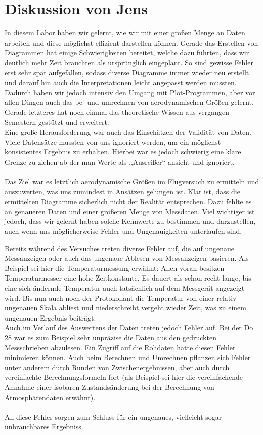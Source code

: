\section{Diskussion von Jens}
In diesem Labor haben wir gelernt, wie wir mit einer großen Menge an Daten arbeiten und diese möglichst effizient darstellen können. Gerade das Erstellen von Diagrammen hat einige Schwierigkeiten bereitet, welche dazu führten, dass wir deutlich mehr Zeit brauchten als ursprünglich eingeplant. So sind gewisse Fehler erst sehr spät aufgefallen, sodass diverse Diagramme immer wieder neu erstellt und darauf hin auch die Interpretationen leicht angepasst werden mussten. Dadurch haben wir jedoch intensiv den Umgang mit Plot-Programmen, aber vor allen Dingen auch das be- und umrechnen von aerodynamischen Größen gelernt. Gerade letzteres hat noch einmal das theoretische Wissen aus vergangen Semestern gestützt und erweitert.\\
Eine große Herausforderung war auch das Einschätzen der Validität von Daten. Viele Datensätze mussten von uns ignoriert werden, um ein möglichst konsistentes Ergebnis zu erhalten. Hierbei war es jedoch schwierig eine klare Grenze zu ziehen ab der man Werte als ,,Ausreißer`` ansieht und ignoriert.\\\\
Das Ziel war es letztlich aerodynamische Größen im Flugversuch zu ermitteln und auszuwerten, was uns zumindest in Ansätzen gelungen ist. Klar ist, dass die ermittelten Diagramme sicherlich nicht der Realität entsprechen. Dazu fehlte es an genaueren Daten und einer größeren Menge von Messdaten. Viel wichtiger ist jedoch, dass wir gelernt haben solche Kennwerte zu bestimmen und darzustellen, auch wenn uns möglicherweise Fehler und Ungenauigkeiten unterlaufen sind.

Bereits während des Versuches treten diverse Fehler auf, die auf ungenaue Messanzeigen oder auch das ungenaue Ablesen von Messanzeigen basieren. Als Beispiel sei hier die Temperaturmessung erwähnt: Allen voran besitzen Temperaturmesser eine hohe Zeitkonstante. Es dauert als schon recht lange, bis eine sich ändernde Temperatur auch tatsächlich auf dem Messgerät angezeigt wird. Bis nun auch noch der Protokollant die Temperatur von einer relativ ungenauen Skala abliest und niederschreibt vergeht wieder Zeit, was zu einem ungenauen Ergebnis beiträgt.\\
Auch im Verlauf des Auswertens der Daten treten jedoch Fehler auf. Bei der Do 28 war es zum Beispiel sehr unpräzise die Daten aus den gedruckten Messschrieben abzulesen. Ein Zugriff auf die Rohdaten hätte diesen Fehler minimieren können. Auch beim Berechnen und Umrechnen pflanzen sich Fehler unter anderem durch Runden von Zwischenergebnissen, aber auch durch vereinfachte Berechnungsformeln fort (als Beispiel sei hier die vereinfachende Annahme einer isobaren Zustandsänderung bei der Berechnung von Atmosphärendaten erwähnt).\\\\
All diese Fehler sorgen zum Schluss für ein ungenaues, vielleicht sogar unbrauchbares Ergebniss.

